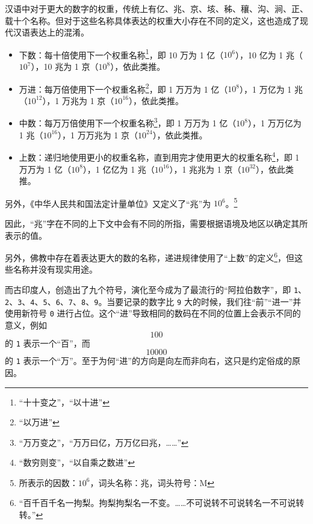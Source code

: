         \begin{displayquote}
            汉语中对于更大的数字的权重，传统上有亿、兆、京、垓、秭、穰、沟、涧、正、载十个名称。但对于这些名称具体表达的权重大小存在不同的定义，这也造成了现代汉语表达上的混淆。

            \begin{itemize}
                \item 下数：每十倍使用下一个权重名称\footnote{“十十变之”\cite[卷上 12]{wujin}，“以十进”\cite[卷一 15]{shulijinyun}}，即 10 万为 1 亿（$10^6$），10 亿为 1 兆（$10^7$），10 兆为 1 京（$10^8$），依此类推。
                \item 万进：每万倍使用下一个权重名称\footnote{“以万进”\cite[卷一 15]{shulijinyun}}，即 1 万万为 1 亿（$10^8$），1 万亿为 1 兆（$10^{12}$），1 万兆为 1 京（$10^{16}$），依此类推。
                \item 中数：每万万倍使用下一个权重名称\footnote{“万万变之”\cite[卷上 12]{wujin}，“万万曰亿，万万亿曰兆，……”\cite[卷上 3]{sunzi}}，即 1 万万为 1 亿（$10^8$），1 万万亿为 1 兆（$10^{16}$），1 万万兆为 1 京（$10^{24}$），依此类推。
                \item 上数：递归地使用更小的权重名称，直到用完才使用更大的权重名称\footnote{“数穷则变”\cite[卷上 12]{wujin}，“以自乘之数进”\cite[卷上 15]{shulijinyun}}，即 1 万万为 1 亿（$10^8$），1 亿亿为 1 兆（$10^{16}$），1 兆兆为 1 京（$10^{32}$），依此类推。
            \end{itemize}
            另外，《中华人民共和国法定计量单位》又定义了“兆”为 $10^6$。\footnote{所表示的因数：$10^6$，词头名称：兆，词头符号：M\cite[附件 表 5]{gf1984-28}}

            因此，“兆”字在不同的上下文中会有不同的所指，需要根据语境及地区以确定其所表示的值。

            另外，佛教中存在着表达更大的数的名称，递进规律使用了“上数”的定义\footnote{“百千百千名一拘梨。拘梨拘梨名一不变。……不可说转不可说转名一不可说转转。”\cite[卷第二十九 1]{huayan}}，但这些名称并没有现实用途。
        \end{displayquote}

        而古印度人，创造出了九个符号，演化至今成为了最流行的“阿拉伯数字”，即 \texttt{1}、\texttt{2}、\texttt{3}、\texttt{4}、\texttt{5}、\texttt{6}、\texttt{7}、\texttt{8}、\texttt{9}。当要记录的数字比 \texttt{9} 大的时候，我们往“前”“进一”并使用新符号 \texttt{0} 进行占位。这个“进”导致相同的数码在不同的位置上会表示不同的意义，例如 \[100\] 的 \texttt{1} 表示一个“百”，而 \[10000\]的 \texttt{1} 表示一个“万”。至于为何“进”的方向是向左而非向右，这只是约定俗成的原因。

